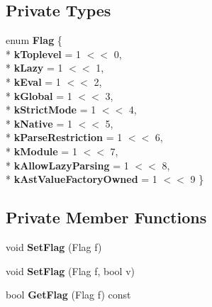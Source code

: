 \subsection*{Private Types}
\begin{DoxyCompactItemize}
\item 
enum {\bfseries Flag} \{ \\*
{\bfseries k\+Toplevel} = 1 $<$$<$ 0, 
\\*
{\bfseries k\+Lazy} = 1 $<$$<$ 1, 
\\*
{\bfseries k\+Eval} = 1 $<$$<$ 2, 
\\*
{\bfseries k\+Global} = 1 $<$$<$ 3, 
\\*
{\bfseries k\+Strict\+Mode} = 1 $<$$<$ 4, 
\\*
{\bfseries k\+Native} = 1 $<$$<$ 5, 
\\*
{\bfseries k\+Parse\+Restriction} = 1 $<$$<$ 6, 
\\*
{\bfseries k\+Module} = 1 $<$$<$ 7, 
\\*
{\bfseries k\+Allow\+Lazy\+Parsing} = 1 $<$$<$ 8, 
\\*
{\bfseries k\+Ast\+Value\+Factory\+Owned} = 1 $<$$<$ 9
 \}\hypertarget{classv8_1_1internal_1_1_parse_info_a06662dd8b5fe989d7808930a84008926}{}\label{classv8_1_1internal_1_1_parse_info_a06662dd8b5fe989d7808930a84008926}

\end{DoxyCompactItemize}
\subsection*{Private Member Functions}
\begin{DoxyCompactItemize}
\item 
void {\bfseries Set\+Flag} (Flag f)\hypertarget{classv8_1_1internal_1_1_parse_info_a35c4af1ab005bdf0c28fb1ba0fd0d894}{}\label{classv8_1_1internal_1_1_parse_info_a35c4af1ab005bdf0c28fb1ba0fd0d894}

\item 
void {\bfseries Set\+Flag} (Flag f, bool v)\hypertarget{classv8_1_1internal_1_1_parse_info_a73e9c436f7bcf54f99f7f9f148737b13}{}\label{classv8_1_1internal_1_1_parse_info_a73e9c436f7bcf54f99f7f9f148737b13}

\item 
bool {\bfseries Get\+Flag} (Flag f) const \hypertarget{classv8_1_1internal_1_1_parse_info_ad600c373db4dea98c63e79300cc0cd68}{}\label{classv8_1_1internal_1_1_parse_info_ad600c373db4dea98c63e79300cc0cd68}

\end{DoxyCompactItemize}
